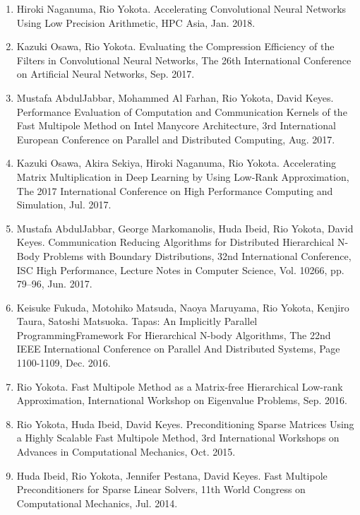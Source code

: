 \documentclass[margin,line]{cv}
\begin{document}
\begin{resume}
\begin{enumerate}
\item Hiroki Naganuma, Rio Yokota. Accelerating Convolutional Neural Networks Using Low Precision Arithmetic, HPC Asia, Jan. 2018.

\item Kazuki Osawa, Rio Yokota. Evaluating the Compression Efficiency of the Filters in Convolutional Neural Networks, The 26th International Conference on Artificial Neural Networks, Sep. 2017.

\item Mustafa AbdulJabbar, Mohammed Al Farhan, Rio Yokota, David Keyes. Performance Evaluation of Computation and Communication Kernels of the Fast Multipole Method on Intel Manycore Architecture, 3rd International European Conference on Parallel and Distributed Computing, Aug. 2017.

\item Kazuki Osawa, Akira Sekiya, Hiroki Naganuma, Rio Yokota. Accelerating Matrix Multiplication in Deep Learning by Using Low-Rank Approximation, The 2017 International Conference on High Performance Computing and Simulation, Jul. 2017.

\item Mustafa AbdulJabbar, George Markomanolis, Huda Ibeid, Rio Yokota, David Keyes. Communication Reducing Algorithms for Distributed Hierarchical N-Body Problems with Boundary Distributions, 32nd International Conference, ISC High Performance, Lecture Notes in Computer Science, Vol. 10266, pp. 79--96, Jun. 2017.

\item Keisuke Fukuda, Motohiko Matsuda, Naoya Maruyama, Rio Yokota, Kenjiro Taura, Satoshi Matsuoka. Tapas: An Implicitly Parallel ProgrammingFramework For Hierarchical N-body Algorithms, The 22nd IEEE International Conference on Parallel And Distributed Systems, Page 1100-1109, Dec. 2016.

\item Rio Yokota. Fast Multipole Method as a Matrix-free Hierarchical Low-rank Approximation, International Workshop on Eigenvalue Problems, Sep. 2016.

\item Rio Yokota, Huda Ibeid, David Keyes. Preconditioning Sparse Matrices Using a Highly Scalable Fast Multipole Method, 3rd International Workshops on Advances in Computational Mechanics, Oct. 2015.

\item Huda Ibeid, Rio Yokota, Jennifer Pestana, David Keyes. Fast Multipole Preconditioners for Sparse Linear Solvers, 11th World Congress on Computational Mechanics, Jul. 2014.


\end{enumerate}
\end{resume}
\end{document}
